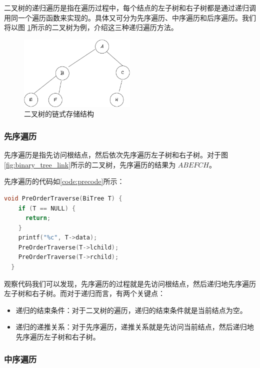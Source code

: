 \documentclass[lang=cn,newtx,10pt,scheme=chinese]{../elegantbook}
\begin{document}
二叉树的递归遍历是指在遍历过程中，每个结点的左子树和右子树都是通过递归调用同一个遍历函数来实现的。具体又可分为先序遍历、中序遍历和后序遍历。我们将以图
\ref{fig:one_binary_tree_link}所示的二叉树为例，介绍这三种递归遍历方法。

\begin{figure}
  \centering
  \includegraphics[width=0.5\textwidth]{./figure/pdf/cropped/oneBTree.pdf}
  \caption{二叉树的链式存储结构}
  \label{fig:one_binary_tree_link}
\end{figure}

\subsubsection{先序遍历}

先序遍历是指先访问根结点，然后依次先序遍历左子树和右子树。对于图\ref{fig:binary_tree_link}所示的二叉树，先序遍历的结果为 $ABEFCH$。

先序遍历的代码如\ref{code:precode}所示：


\begin{lstlisting}[language=C++, caption={先序遍历}, label={code:precode}]
  void PreOrderTraverse(BiTree T) {
    if (T == NULL) {
      return;
    }
    printf("%c", T->data);
    PreOrderTraverse(T->lchild);
    PreOrderTraverse(T->rchild);
  }
\end{lstlisting}

观察代码我们可以发现，先序遍历的过程就是先访问根结点，然后递归地先序遍历左子树和右子树。而对于递归而言，有两个关键点：

\begin{itemize}
  \item 递归的结束条件：对于二叉树的遍历，递归的结束条件就是当前结点为空。
  \item 递归的递推关系：对于先序遍历，递推关系就是先访问当前结点，然后递归地先序遍历左子树和右子树。
  \end{itemize}





\subsubsection{中序遍历}
\end{document}
